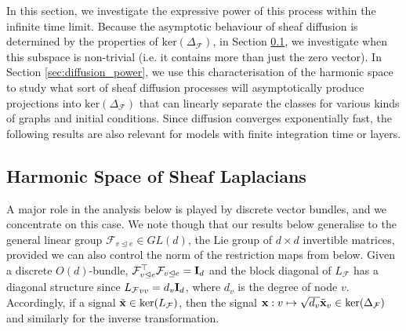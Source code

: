 \documentclass{article}
\def\vx{{\bf{x}}}
\def\mI{{\bf{I}}}
\def\gF{{\mathcal{F}}}
\newcommand{\tleq}{\trianglelefteq}
\begin{document}
In this section, we investigate the expressive power of this process within the infinite time limit. Because the asymptotic behaviour of sheaf diffusion is determined by the properties of $\mathrm{ker}(\Delta_\gF)$, in Section \ref{sec:harmonic_space}, we investigate when this subspace is non-trivial (i.e. it contains more than just the zero vector). In Section \ref{sec:diffusion_power}, we use this characterisation of the harmonic space to study what sort of sheaf diffusion processes will asymptotically produce projections into $\mathrm{ker}(\Delta_\gF)$ that can linearly separate the classes for various kinds of graphs and initial conditions. Since diffusion converges exponentially fast, the following results are also relevant for models with finite integration time or layers. 

\subsection{Harmonic Space of Sheaf Laplacians}\label{sec:harmonic_space}

A major role in the analysis below is played by discrete vector bundles, and we concentrate on this case. We note though that our results below generalise to the general linear group $\mathcal{F}_{v\tleq e}\in GL(d)$, the Lie group of $d\times d$ invertible matrices, provided we can also control the norm of the restriction maps from below. Given a discrete $O(d)$-bundle, $\gF_{v\tleq e}^\top\gF_{v\tleq e} = \mI_d$ and the block diagonal of $L_{\mathcal{F}}$ has a diagonal structure since ${L_{\mathcal{F}}}_{vv} = d_{v}\mI_{d}$, where $d_v$ is the degree of node $v$. Accordingly, if a signal $\tilde{\vx}\in \mathrm{ker}(L_\gF)$, then the signal $\vx:v\mapsto \sqrt{d_{v}}\tilde{\vx}_{v}\in\mathrm{ker}(\Delta_\gF)$ and similarly for the inverse transformation.  
\end{document}
